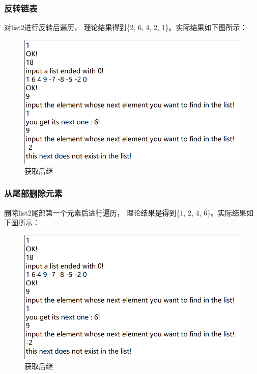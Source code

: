 \documentclass[supercite]{Experimental_Report}
\theoremstyle{definition}
\begin{document}
\subsubsection{反转链表}
对list2进行反转后遍历， 理论结果得到\{2, 6, 4, 2, 1\}。实际结果如下图所示：
\begin{figure}[htbp]
	\centering
	\includegraphics[scale = 0.7]{images/8.png}
	\caption{获取后继}
\end{figure}

\subsubsection{从尾部删除元素}
删除list2尾部第一个元素后进行遍历， 理论结果是得到\{1, 2, 4, 6\}。实际结果如下图所示：
\begin{figure}[htbp]
	\centering
	\includegraphics[scale = 0.7]{images/8.png}
	\caption{获取后继}
\end{figure}
\end{document}
